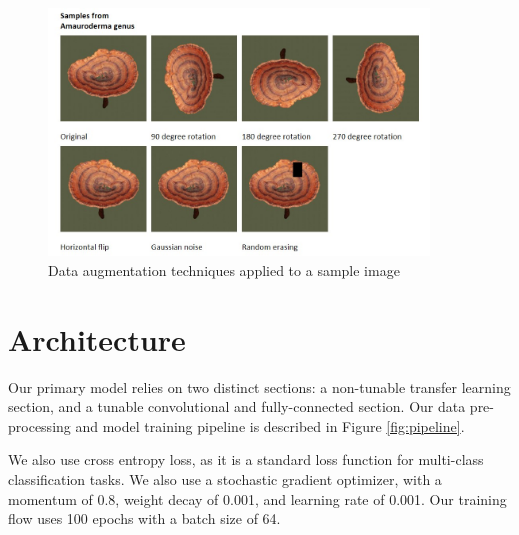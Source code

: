 \documentclass{article} %
\begin{document}
\FloatBarrier
\begin{figure}[h]
    \begin{center}
    \includegraphics[width=0.9\textwidth]{figures/data_augmentation_example.jpg}
    \end{center}
    \caption{Data augmentation techniques applied to a sample image}
    \label{fig:augmentation}
\end{figure}
\FloatBarrier

\section{Architecture}
\label{sec:architecture}
Our primary model relies on two distinct sections: a non-tunable transfer learning section, and a tunable convolutional and fully-connected section. Our data pre-processing and model training pipeline is described in Figure \ref{fig:pipeline}.

We also use cross entropy loss, as it is a standard loss function for multi-class classification tasks. We also use a stochastic gradient optimizer, with a momentum of 0.8, weight decay of 0.001, and learning rate of 0.001. Our training flow uses 100 epochs with a batch size of 64.
\end{document}

